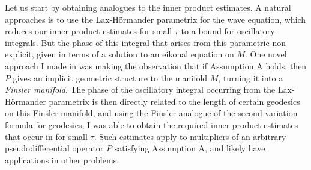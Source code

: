 \documentclass[11pt]{article}
\DeclareMathOperator{\RR}{\mathbb{R}}
\begin{document}

Let us start by obtaining analogues to the inner product estimates. A natural approaches is to use the Lax-H\"{o}rmander parametrix for the wave equation, which reduces our inner product estimates for small $\tau$ to a bound for oscillatory integrals. But the phase of this integral that arises from this parametric non-explicit, given in terms of a solution to an eikonal equation on $M$. One novel approach I made in \cite{DensonCharacterization} was making the observation that if Assumption A holds, then $P$ gives an implicit geometric structure to the manifold $M$, turning it into a \emph{Finsler manifold}. %
The phase of the oscillatory integral occurring from the Lax-H\"{o}rmander parametrix is then directly related to the length of certain geodesics on this Finsler manifold, and using the Finsler analogue of the second variation formula for geodesics, I was able to obtain the required inner product estimates that occur in \cite{HeoNazarovSeeger} for small $\tau$. Such estimates apply to multipliers of an arbitrary pseudodifferential operator $P$ satisfying Assumption A, and likely have applications in other problems.
\end{document}
